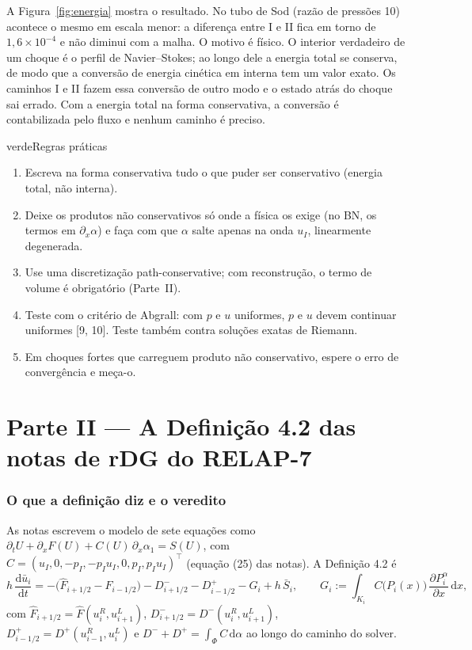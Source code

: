 \documentclass[11pt,a4paper]{article}
\theoremstyle{definition}
\theoremstyle{remark}
\newcommand{\pd}[2]{\frac{\partial #1}{\partial #2}}
\newcommand{\dd}{\mathrm{d}}
\newcommand{\Fh}{\widehat F}
\newcommand{\ub}{\bar u}
\begin{document}
A Figura~\ref{fig:energia} mostra o resultado. No tubo de Sod (razão de pressões 10) acontece o mesmo em escala menor: a diferença entre I e II fica em torno de $1{,}6\times10^{-4}$ e não diminui com a malha. O motivo é físico. O interior verdadeiro de um choque é o perfil de Navier--Stokes; ao longo dele a energia total se conserva, de modo que a conversão de energia cinética em interna tem um valor exato. Os caminhos I e II fazem essa conversão de outro modo e o estado atrás do choque sai errado. Com a energia total na forma conservativa, a conversão é contabilizada pelo fluxo e nenhum caminho é preciso.

\begin{quadro}{verde}{Regras práticas}
\begin{enumerate}[leftmargin=*]
\item Escreva na forma conservativa tudo o que puder ser conservativo (energia total, não interna).
\item Deixe os produtos não conservativos só onde a física os exige (no BN, os termos em $\partial_x\alpha$) e faça com que $\alpha$ salte apenas na onda $u_I$, linearmente degenerada.
\item Use uma discretização path-conservative; com reconstrução, o termo de volume é obrigatório (Parte~II).
\item Teste com o critério de Abgrall: com $p$ e $u$ uniformes, $p$ e $u$ devem continuar uniformes [9, 10]. Teste também contra soluções exatas de Riemann.
\item Em choques fortes que carreguem produto não conservativo, espere o erro de convergência e meça-o.
\end{enumerate}
\end{quadro}

\part*{Parte II --- A Definição 4.2 das notas de rDG do RELAP-7}

\section{O que a definição diz e o veredito}

As notas escrevem o modelo de sete equações como $\partial_tU+\partial_xF(U)+C(U)\,\partial_x\alpha_1=S(U)$, com $C=(u_I,0,-p_I,-p_Iu_I,0,p_I,p_Iu_I)^\top$ (equação (25) das notas). A Definição 4.2 é
\begin{equation}\label{eq:def42}
h\,\frac{\dd\ub_i}{\dd t}=-\big(\Fh_{i+1/2}-\Fh_{i-1/2}\big)-D^-_{i+1/2}-D^+_{i-1/2}-G_i+h\,\bar S_i,\qquad
G_i:=\int_{K_i}C\big(P_i(x)\big)\,\pd{P_i^\alpha}{x}\,\dd x,
\end{equation}
com $\Fh_{i+1/2}=\Fh(u_i^R,u_{i+1}^L)$, $D^-_{i+1/2}=D^-(u_i^R,u_{i+1}^L)$, $D^+_{i-1/2}=D^+(u_{i-1}^R,u_i^L)$ e $D^-+D^+=\int_\Phi C\,\dd\alpha$ ao longo do caminho do solver.
\end{document}
